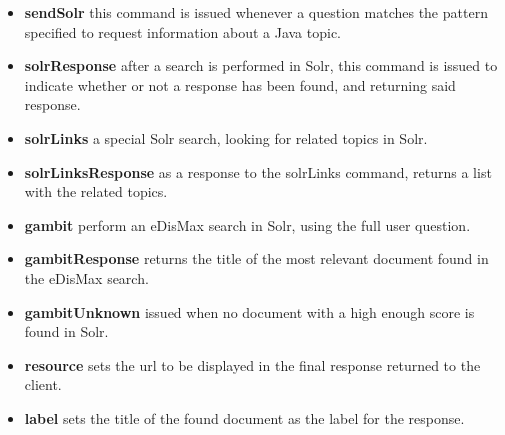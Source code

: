 \begin{itemize}
 \item \textbf{sendSolr} this command is issued whenever a question matches the pattern specified to request information about a Java topic.
 \item \textbf{solrResponse} after a search is performed in Solr, this command is issued to indicate whether or not a response has been found, and returning said response.
 \item \textbf{solrLinks} a special Solr search, looking for related topics in Solr.
 \item \textbf{solrLinksResponse} as a response to the solrLinks command, returns a list with the related topics.
 \item \textbf{gambit} perform an \ac{eDisMax} search in Solr, using the full user question.
 \item \textbf{gambitResponse} returns the title of the most relevant document found in the \ac{eDisMax} search.
 \item \textbf{gambitUnknown} issued when no document with a high enough score is found in Solr.
 \item \textbf{resource} sets the url to be displayed in the final response returned to the client.
 \item \textbf{label} sets the title of the found document as the label for the response.
\end{itemize}

